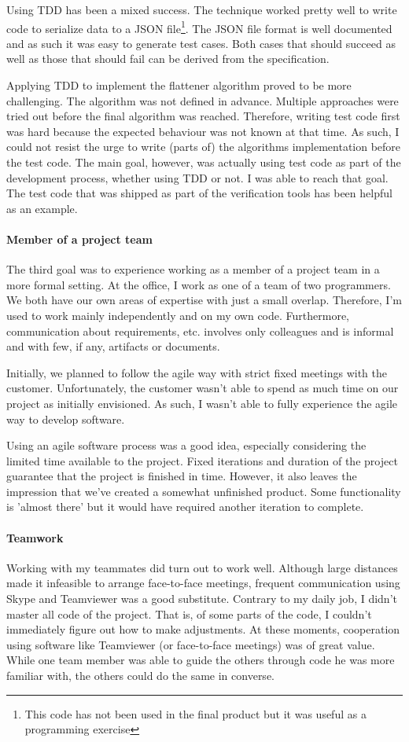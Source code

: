Using TDD has been a mixed success. The technique worked pretty well to write code
to serialize data to a JSON file\footnote{This code has not been used in the
final product but it was useful as a programming exercise}. The JSON file format
is well documented and as such it was easy to generate test cases. Both cases that
should succeed as well as those that should fail can be derived from the specification.

Applying TDD to implement the flattener algorithm proved to be more challenging.
The algorithm was not defined in advance. Multiple approaches were tried out
before the final algorithm was reached. Therefore, writing test code first was
hard because the expected behaviour was not known at that time. As such, I could not
resist the urge to write (parts of) the algorithms implementation before the test
code. The main goal, however, was actually using test code as part of the development
process, whether using TDD or not. I was able to reach that goal. The test code that
was shipped as part of the verification tools has been helpful as an example.

\paragraph{Member of a project team}
The third goal was to experience working as a member of a project team in a more
formal setting. At the office, I work as one of a team of two programmers. We both
have our own areas of expertise with just a small overlap. Therefore, I'm used
to work mainly independently and on my own code. Furthermore, communication about
requirements, etc. involves only colleagues and is informal and with few, if any, artifacts
or documents.

Initially, we planned to follow the agile way with strict fixed meetings with
the customer. Unfortunately, the customer wasn't able to spend as much time
on our project as initially envisioned. As such, I wasn't able to fully experience
the agile way to develop software.

Using an agile software process was a good idea, especially considering the limited
time available to the project. Fixed iterations and duration of the project guarantee
that the project is finished in time. However, it also leaves the impression that
we've created a somewhat unfinished product. Some functionality is 'almost there'
but it would have required another iteration to complete.

\paragraph{Teamwork}
Working with my teammates did turn out to work well. Although large distances
made it infeasible to arrange face-to-face meetings, frequent communication
using Skype and Teamviewer was a good substitute. Contrary to my daily job, I
didn't master all code of the project. That is, of some parts of the code, I
couldn't immediately figure out how to make adjustments. At these moments,
cooperation using software like Teamviewer (or face-to-face meetings) was
of great value. While one team member was able to guide the others through
code he was more familiar with, the others could do the same in converse.

